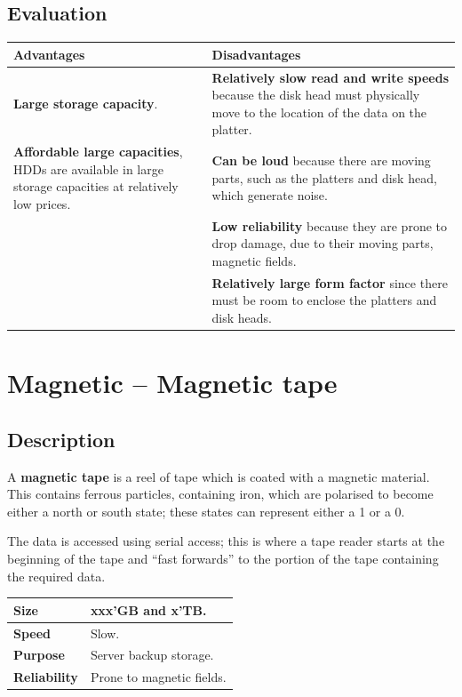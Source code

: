 \documentclass[a4paper]{systems-software}
\begin{document}
\subsection*{Evaluation}

\begin{longtabu} to \textwidth {| X[1,l] | X[1,l] |}
    \hline
    \textbf{Advantages} & \textbf{Disadvantages}
	\\ \hline
	\textbf{Large storage capacity}. & \textbf{Relatively slow read and write speeds} because the disk head must physically move to the location of the data on the platter.
	\\ \hline
	\textbf{Affordable large capacities}, HDDs are available in large storage capacities at relatively low prices. & \textbf{Can be loud} because there are moving parts, such as the platters and disk head, which generate noise.
	\\ \hline
	& \textbf{Low reliability} because they are prone to drop damage, due to their moving parts, magnetic fields.
	\\ \hline
	& \textbf{Relatively large form factor} since there must be room to enclose the platters and disk heads.
	\\ \hline
\end{longtabu}


\section*{Magnetic -- Magnetic tape}

\subsection*{Description}

A \textbf{magnetic tape} is a reel of tape which is coated with a magnetic material. This contains ferrous particles, containing iron, which are polarised to become either a north or south state; these states can represent either a 1 or a 0.

The data is accessed using serial access; this is where a tape reader starts at the beginning of the tape and “fast forwards” to the portion of the tape containing the required data.

\begin{longtabu} to \textwidth {| X[1,l] | X[6,l] |}
    \hline
    \textbf{Size} & xxx’GB and x’TB.
	\\ \hline
	\textbf{Speed} & Slow.
	\\ \hline
	\textbf{Purpose} & Server backup storage.
	\\ \hline
	\textbf{Reliability} & Prone to magnetic fields.
	\\ \hline
\end{longtabu}
\end{document}

